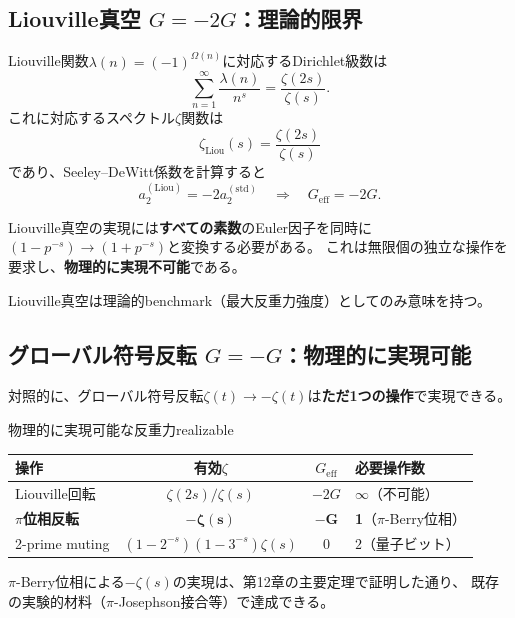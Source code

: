 \documentclass[11pt,a4paper]{article}
\newcommand{\Geff}{G_{\mathrm{eff}}}
\begin{document}
\subsection{Liouville真空 $G = -2G$：理論的限界}
\label{sec:13.2}

Liouville関数$\lambda(n) = (-1)^{\Omega(n)}$に対応するDirichlet級数は
\[
\sum_{n=1}^{\infty} \frac{\lambda(n)}{n^s} = \frac{\zeta(2s)}{\zeta(s)}.
\]
これに対応するスペクトル$\zeta$関数は
\[
\zeta_{\text{Liou}}(s) = \frac{\zeta(2s)}{\zeta(s)}
\]
であり、Seeley--DeWitt係数を計算すると
\[
a_2^{(\text{Liou})} = -2 a_2^{(\text{std})}
\quad\Longrightarrow\quad
\Geff = -2G.
\]

\begin{tcolorbox}[colback=red!5!white, colframe=red!75!black, title=物理的実現不可能性]
Liouville真空の実現には\textbf{すべての素数}のEuler因子を同時に
$(1-p^{-s}) \to (1+p^{-s})$と変換する必要がある。
これは無限個の独立な操作を要求し、\textbf{物理的に実現不可能}である。

Liouville真空は理論的benchmark（最大反重力強度）としてのみ意味を持つ。
\end{tcolorbox}


\subsection{グローバル符号反転 $G = -G$：物理的に実現可能}
\label{sec:13.3}

対照的に、グローバル符号反転$\zeta(t) \to -\zeta(t)$は\textbf{ただ1つの操作}で実現できる。

\begin{keyresult}{物理的に実現可能な反重力}{realizable}
\begin{center}
\begin{tabular}{lccl}
\toprule
\textbf{操作} & \textbf{有効$\zeta$} & \textbf{$\Geff$} & \textbf{必要操作数} \\
\midrule
Liouville回転 & $\zeta(2s)/\zeta(s)$ & $-2G$ & $\infty$（不可能） \\
\textbf{$\pi$位相反転} & $\mathbf{-\zeta(s)}$ & $\mathbf{-G}$ & \textbf{1}（$\pi$-Berry位相） \\
2-prime muting & $(1\!-\!2^{-s})(1\!-\!3^{-s})\zeta(s)$ & $0$ & $2$（量子ビット） \\
\bottomrule
\end{tabular}
\end{center}
$\pi$-Berry位相による$-\zeta(s)$の実現は、第12章の主要定理で証明した通り、
既存の実験的材料（$\pi$-Josephson接合等）で達成できる。
\end{keyresult}
\end{document}
